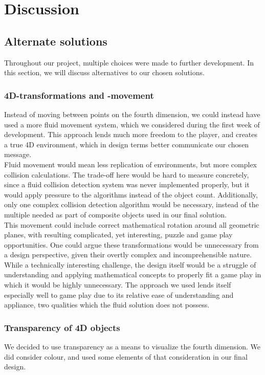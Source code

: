 \section{Discussion}
\subsection{Alternate solutions}
Throughout our project, multiple choices were made to further development. In this section, we will discuss alternatives to our chosen solutions.

\subsubsection{4D-transformations and -movement}
Instead of moving between points on the fourth dimension, we could instead have used a more fluid movement system, which we considered during the first week of development. This approach lends much more freedom to the player, and creates a true 4D environment, which in design terms better communicate our chosen message.\\

Fluid movement would mean less replication of environments, but more complex collision calculations. The trade-off here would be hard to measure concretely, since a fluid collision detection system was never implemented properly, but it would apply pressure to the algorithms instead of the object count. Additionally, only one complex collision detection algorithm would be necessary, instead of the multiple needed as part of composite objects used in our final solution.\\

This movement could include correct mathematical rotation around all geometric planes, with resulting complicated, yet interesting, puzzle and game play opportunities. One could argue these transformations would be unnecessary from a design perspective, given their overtly complex and incomprehensible nature.\\

While a technically interesting challenge, the design itself would be a struggle of understanding and applying mathematical concepts to properly fit a game play in which it would be highly unnecessary. The approach we used lends itself especially well to game play due to its relative ease of understanding and appliance, two qualities which the fluid solution does not possess.

\subsubsection{Transparency of 4D objects}
We decided to use transparency as a means to visualize the fourth dimension. We did consider colour, and used some elements of that consideration in our final design.\\


